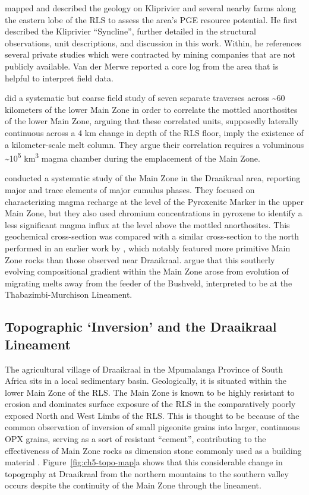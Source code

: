 \citet{vandermerwe2007} mapped and described the geology on Kliprivier and
several nearby farms along the eastern lobe of the RLS to
assess the area's PGE resource potential. He first described the
Kliprivier ``Syncline'', further detailed in the structural
observations, unit descriptions, and discussion in this work. Within, he
references several private studies which were contracted by mining
companies that are not publicly available. Van der Merwe reported a
core log from the area that is helpful to interpret field data.

\citet{latypovetal2022} did a systematic but coarse field study of seven
separate traverses across \textasciitilde60 kilometers of the lower Main
Zone in order to correlate the mottled anorthosites of the lower Main
Zone, arguing that these correlated units, supposedly laterally
continuous across a 4 km change in depth of the RLS floor, imply the
existence of a kilometer-scale melt column. They argue their correlation
requires a voluminous \textasciitilde10\textsuperscript{5}
km\textsuperscript{3} magma chamber during the emplacement of the Main
Zone.

\citet{setera2018} conducted a systematic study of the Main
Zone in the Draaikraal area, reporting major and trace elements of major
cumulus phases. They focused on characterizing magma recharge at the
level of the Pyroxenite Marker in the upper Main Zone, but they also
used chromium concentrations in pyroxene to identify a less significant
magma influx at the level above the mottled anorthosites. This
geochemical cross-section was compared with a similar cross-section to
the north performed in an earlier work by \citet{vantongeren2013},
which notably featured more primitive Main Zone rocks than those
observed near Draaikraal. \citet{setera2018} argue that this
southerly evolving compositional gradient within the Main Zone arose
from evolution of migrating melts away from the feeder of the Bushveld,
interpreted to be at the Thabazimbi-Murchison Lineament.

\subsection{Topographic `Inversion' and the Draaikraal Lineament}
\label{sec:ch5-topographic-inversion-and-the-draaikraal-lineament}

The agricultural village of Draaikraal in the Mpumalanga Province of
South Africa sits in a local sedimentary basin. Geologically, it is
situated within the lower Main Zone of the RLS. The Main Zone is known
to be highly resistant to erosion and dominates surface exposure of the
RLS in the comparatively poorly exposed North and West Limbs of the RLS.
This is thought to be because of the common observation of inversion of
small pigeonite grains into larger, continuous OPX grains, serving as a
sort of resistant ``cement'', contributing to the effectiveness of Main
Zone rocks as dimension stone commonly used as a building material
\citep{cawthorn2015}. Figure~\ref{fig:ch5-topo-map}a shows that this considerable change in
topography at Draaikraal from the northern mountains to the southern
valley occurs despite the continuity of the Main Zone through the
lineament.

